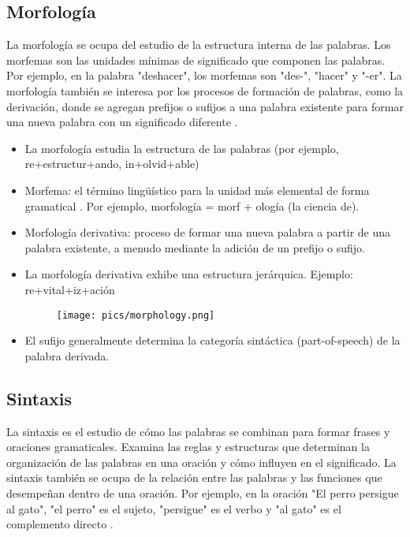\documentclass{book}
\begin{document}
\subsection{Morfología}

La morfología se ocupa del estudio de la estructura interna de las palabras. Los morfemas son las unidades mínimas de significado que componen las palabras. Por ejemplo, en la palabra "deshacer", los morfemas son "des-", "hacer" y "-er". La morfología también se interesa por los procesos de formación de palabras, como la derivación, donde se agregan prefijos o sufijos a una palabra existente para formar una nueva palabra con un significado diferente \cite{JohnsonMLSS}.

\begin{itemize}
\item La morfología estudia la estructura de las palabras (por ejemplo, re+estructur+ando, in+olvid+able) \cite{JohnsonMLSS}
\item Morfema: el término lingüístico para la unidad más elemental de forma gramatical \cite{fromkin2018introduction}. Por ejemplo, morfología = morf + ología (la ciencia de).
\item Morfología derivativa: proceso de formar una nueva palabra a partir de una palabra existente, a menudo mediante la adición de un prefijo o sufijo.
\item La morfología derivativa exhibe una estructura jerárquica. Ejemplo: re+vital+iz+ación
\begin{figure}[h]
\texttt{[image: pics/morphology.png]}
\end{figure}
\item El sufijo generalmente determina la categoría sintáctica (part-of-speech) de la palabra derivada.
\end{itemize}

\subsection{Sintaxis}

La sintaxis es el estudio de cómo las palabras se combinan para formar frases y oraciones gramaticales. Examina las reglas y estructuras que determinan la organización de las palabras en una oración y cómo influyen en el significado. La sintaxis también se ocupa de la relación entre las palabras y las funciones que desempeñan dentro de una oración. Por ejemplo, en la oración "El perro persigue al gato", "el perro" es el sujeto, "persigue" es el verbo y "al gato" es el complemento directo \cite{JohnsonMLSS}.
\end{document}
